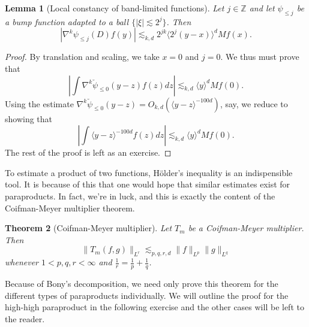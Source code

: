 \documentclass[11pt]{article}
\newtheorem{thm}{Theorem}
\newtheorem{lem}[thm]{Lemma}
\theoremstyle{remark}
\newcommand{\1}{\textbf{1}}
\newcommand{\lle}{\lesssim}
\def\norm#1{\| #1  \|}
\def\brac#1{\langle #1  \rangle}
\newcommand{\bbZ}{\mathbb{Z}}
\begin{document}
\begin{lem}[Local constancy of band-limited functions]
Let $j \in \bbZ$ and let $\psi_{\leq j}$ be a bump function adapted to a ball $\{|\xi| \lle 2^j\}$. Then
\[
|\nabla^k \psi_{\leq j}(D) f(y)| \lle_{k,d} 2^{jk} \brac{2^j(y-x)}^d Mf(x).
\]
\end{lem}
\begin{proof}
By translation and scaling, we take $x = 0$ and $j=0$. We thus must prove that
\[
| \int \nabla^k \check{\psi}_{\leq 0}(y-z) f(z) dz | \lle_{k,d} \brac{y}^d Mf(0).
\]
Using the estimate $\nabla^k \check{\psi}_{\leq 0}(y-z) = O_{k,d}( \brac{y-z}^{-100d})$, say, we reduce to showing that
\[
| \int \brac{y-z}^{-100d} f(z) dz | \lle_{k,d} \brac{y}^d Mf(0).
\]
The rest of the proof is left as an exercise.
\end{proof}
To estimate a product of two functions, H\"older's inequality is an indispensible tool. It is because of this that one would hope that similar estimates exist for paraproducts. In fact, we're in luck, and this is exactly the content of the Coifman-Meyer multiplier theorem.

\begin{thm}[Coifman-Meyer multiplier]
Let $T_m$ be a Coifman-Meyer multiplier. Then
\[
\norm{T_m(f,g)}_{L^r} \lle_{p,q,r,d} \norm{f}_{L^p} \norm{g}_{L^q}
\]
whenever $1 < p,q,r < \infty$ and $\frac{1}{r} = \frac{1}{p} + \frac{1}{q}$.
\end{thm}
Because of Bony's decomposition, we need only prove this theorem for the different types of paraproducts individually. We will outline the proof for the high-high paraproduct in the following exercise and the other cases will be left to the reader.
\end{document}
